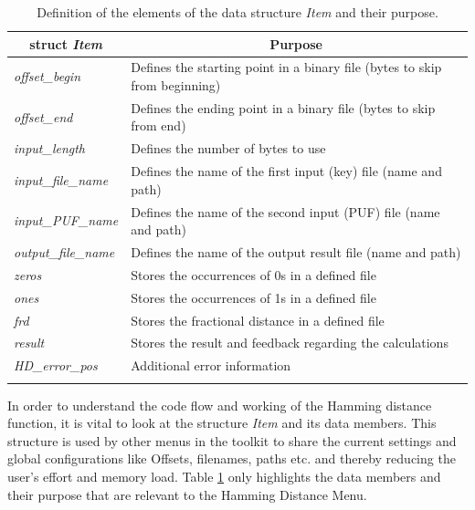 \begin{table}[t]
	\begin{center}
		\begin{tabular}{ll}
			\toprule
			\multicolumn{1}{c}{\textbf{struct \emph{Item}}} & \multicolumn{1}{c}{\textbf{Purpose}}\\
			\midrule
			\hline

			\emph{offset\_begin} & Defines the starting point in a binary file (bytes to skip from beginning)\\

			\emph{offset\_end} & Defines the ending point in a binary file (bytes to skip from end)\\

			\emph{input\_length} & Defines the number of bytes to use \\

			\emph{input\_file\_name} & Defines the name of the first input (key) file (name and path)\\

			\emph{input\_PUF\_name} & Defines the name of the second input (PUF) file (name and path)\\

			\emph{output\_file\_name} & Defines the name of the output result file (name and path)\\

			\emph{zeros} & Stores the occurrences of 0s in a defined file\\

			\emph{ones} & Stores the occurrences of 1s in a defined file\\

			\emph{frd} & Stores the fractional distance in a defined file\\

			\emph{result} & Stores the result and feedback regarding the calculations\\

			\emph{HD\_error\_pos} & Additional error information \\

			\hline
			\addlinespace
			\bottomrule
		\end{tabular}
	\end{center}
	\caption{Definition of the elements of the data structure \emph{Item} and their purpose.}
	\label{table:item}
\end{table}

In order to understand the code flow and working of the Hamming distance function, it is vital to look at the structure \emph{Item} and its data members. This structure is used by other menus in the toolkit to share the current settings and global configurations like Offsets, filenames, paths etc. and thereby reducing the user's effort and memory load. Table \ref{table:item} only highlights the data members and their purpose that are relevant to the Hamming Distance Menu.\\

